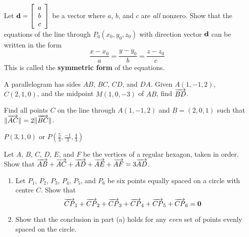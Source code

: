 \begin{multicols}{2}
\begin{ex}
Let
$\textbf{d} = \left[
\begin{array}{c}
a\\
b\\
c
\end{array}
\right]$
 be a vector where $a$, $b$, and $c$ are \textit{all} nonzero. Show that the equations of the line through $P_{0}(x_{0}, y_{0}, z_{0})$ with direction vector $\textbf{d}$ can be written in the form
\begin{equation*}
\frac{x - x_{0}}{a} = \frac{y - y_{0}}{b} = \frac{z -z_{0}}{c}
\end{equation*}
This is called the \textbf{symmetric form} of the equations.
\end{ex}

\begin{ex}
A parallelogram has sides $AB$, $BC$, $CD$, and $DA$. Given $A(1, -1, 2)$, $C(2, 1, 0)$, and the midpoint $M(1, 0, -3)$ of $AB$, find $\overrightarrow{BD}$.
\end{ex}

\begin{ex}
Find all points $C$ on the line through $A(1, -1, 2)$ and $B = (2, 0, 1)$ such that $\| \overrightarrow{AC} \| = 2 \| \overrightarrow{BC} \|$.

\begin{sol}
$P(3, 1, 0)$ or $P(\frac{5}{3}, \frac{-1}{3}, \frac{4}{3})$
\end{sol}
\end{ex}

\begin{ex}
Let $A$, $B$, $C$, $D$, $E$, and $F$ be the vertices of a regular hexagon, taken in order. Show that $\overrightarrow{AB} + \overrightarrow{AC} + \overrightarrow{AD} + \overrightarrow{AE} + \overrightarrow{AF} = 3\overrightarrow{AD}$.
\end{ex}

\begin{ex}
\begin{enumerate}[label={\alph*.}]
\item Let $P_{1}$, $P_{2}$, $P_{3}$, $P_{4}$, $P_{5}$, and $P_{6}$ be six points equally spaced on a circle with centre $C$. Show that
\begin{equation*}
\overrightarrow{CP}_{1} + \overrightarrow{CP}_{2} + \overrightarrow{CP}_{3} + \overrightarrow{CP}_{4} + \overrightarrow{CP}_{5} + \overrightarrow{CP}_{6} = \textbf{0}
\end{equation*}
\item Show that the conclusion in part (a) holds for any \textit{even} set of points evenly spaced on the circle.


\end{enumerate}
\end{ex}
\end{multicols}
